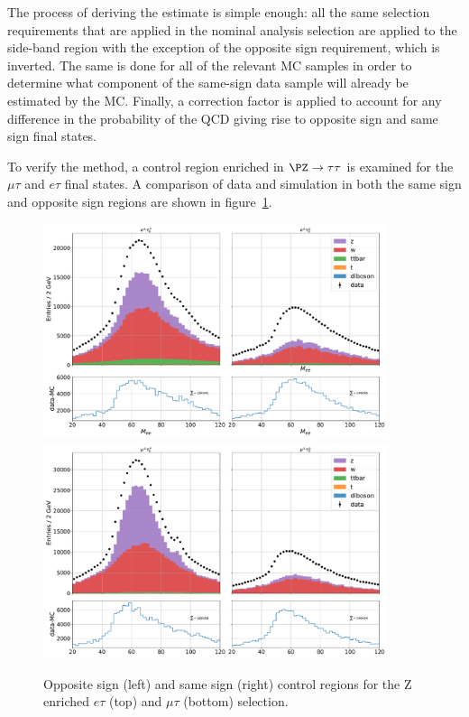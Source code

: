The process of deriving the estimate is simple enough: all the same selection requirements that are applied in the nominal analysis selection are applied to the side-band region with the exception of the opposite sign requirement, which is inverted.  The same is done for all of the relevant MC samples in order to determine what component of the same-sign data sample will already be estimated by the MC.  Finally, a correction factor is applied to account for any difference in the probability of the QCD giving rise to opposite sign and same sign final states.

To verify the method, a control region enriched in $\PZ\to\tau\tau$ is examined for the $\mu\tau$ and $e\tau$ final states.  A comparison of data and simulation in both the same sign and opposite sign regions are shown in figure~\ref{fig:ltau_fakes}.

\begin{figure}
    \centering
    \includegraphics[width=0.9\textwidth]{chapters/Analysis/sectionBackground/figures/etau_cr.pdf}
    \includegraphics[width=0.9\textwidth]{chapters/Analysis/sectionBackground/figures/mutau_cr.pdf}
    \caption{Opposite sign (left) and same sign (right) control regions for the Z enriched $e\tau$ (top) and $\mu\tau$ (bottom) selection.}
    \label{fig:ltau_fakes}
\end{figure}


